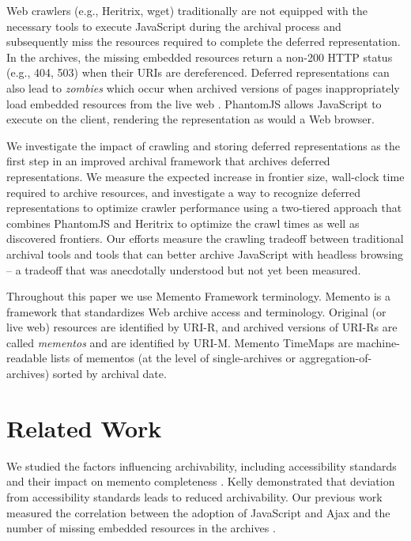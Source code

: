 \documentclass{ipres_proc_article-sp}
\begin{document}
Web crawlers (e.g., Heritrix, wget) traditionally are not equipped with the necessary tools to execute JavaScript during the archival process \cite{googleJS} and subsequently miss the resources required to complete the deferred representation. In the archives, the missing embedded resources return a non-200 HTTP status (e.g., 404, 503) when their URIs are dereferenced. Deferred representations can also lead to \emph{zombies} which occur when archived versions of pages inappropriately load embedded resources from the live web \cite{zombies}. %
PhantomJS allows JavaScript to execute on the client, rendering the representation as would a Web browser.

We investigate the impact of crawling and storing deferred representations as the first step in an improved archival framework that archives deferred representations. We measure the expected increase in frontier size, wall-clock time required to archive resources, and investigate a way to recognize deferred representations to optimize crawler performance using a two-tiered approach that combines PhantomJS and Heritrix to optimize the crawl times as well as discovered frontiers. Our efforts measure the crawling tradeoff between traditional archival tools and tools that can better archive JavaScript with headless browsing -- a tradeoff that was anecdotally understood but not yet been measured.

Throughout this paper we use Memento Framework terminology. Memento \cite{nelson:memento:tr} is a framework that standardizes Web archive access and terminology. Original (or live web) resources are identified by URI-R, and archived versions of URI-Rs are called \emph{mementos} and are identified by URI-M. Memento TimeMaps are machine-readable lists of mementos (at the level of single-archives or aggregation-of-archives) sorted by archival date.

\section{Related Work}
\label{priorwork}
We studied the factors influencing archivability, including accessibility standards and their impact on memento completeness \cite{kellyTPDL2013}. Kelly demonstrated that deviation from accessibility standards leads to reduced archivability. Our previous work measured the correlation between the adoption of JavaScript and Ajax and the number of missing embedded resources in the archives \cite{ijdl}.
\end{document}

